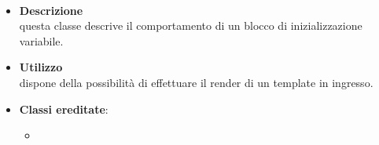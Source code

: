 \paragraph{}
\label{\nogloxy{SWEDesigner::Server::Project::ParsedInitialize}}
\begin{itemize}
\item \textbf{Descrizione}\\
questa classe descrive il comportamento di un blocco di inizializzazione variabile.
\item \textbf{Utilizzo}\\
dispone della possibilità di effettuare il render di un template in ingresso.
\item \textbf{Classi ereditate}:
\begin{itemize}
\item \hyperref[\nogloxy{SWEDesigner::Server::Project::ParsedInstruction}]{}
\end{itemize}
\end{itemize}

